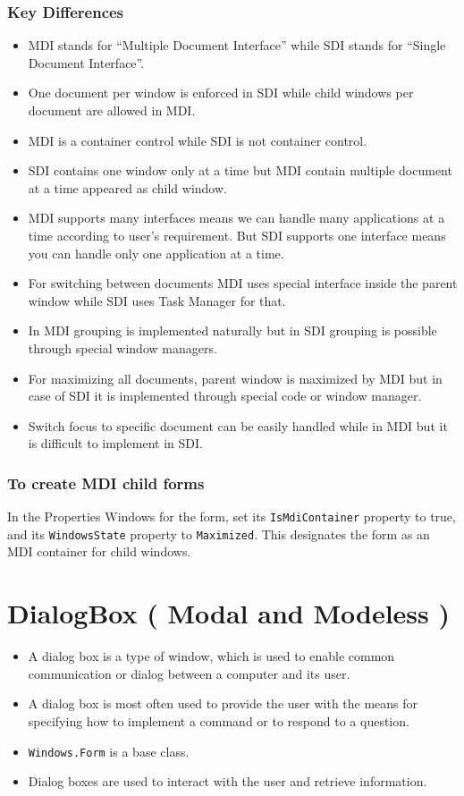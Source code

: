 \subsubsection*{Key Differences}
\begin{itemize}
	\item MDI stands for “Multiple Document Interface” while SDI stands for “Single Document
	Interface”.
	\item One document per window is enforced in SDI while child windows per document are
	allowed in MDI.
	\item MDI is a container control while SDI is not container control.
	\item SDI contains one window only at a time but MDI contain multiple document at a time
	appeared as child window.
	\item MDI supports many interfaces means we can handle many applications at a time according to
	user’s requirement. But SDI supports one interface means you can handle only
	one application at a time.
	\item For switching between documents MDI uses special interface inside the parent window
	while SDI uses Task Manager for that.
	\item In MDI grouping is implemented naturally but in SDI grouping is possible through special
	window managers.
	\item For maximizing all documents, parent window is maximized by MDI but in case of SDI it is
	implemented through special code or window manager.
	\item Switch focus to specific document can be easily handled while in MDI but it is difficult to
	implement in SDI.
\end{itemize}

\subsubsection*{To create MDI child forms}
In the Properties Windows for the form, set its \texttt{IsMdiContainer} property to true, and its \texttt{WindowsState} property to \texttt{Maximized}.
This designates the form as an MDI container for child windows.


\section{DialogBox ( Modal and Modeless )}

\begin{itemize}
	\item A dialog box is a type of window, which is used to enable common communication or dialog
	between a computer and its user.
	\item A dialog box is most often used to provide the user with the means for specifying how to
	implement a command or to respond to a question.
	\item \texttt{Windows.Form} is a base class.
	\item Dialog boxes are used to interact with the user and retrieve information.
\end{itemize}


